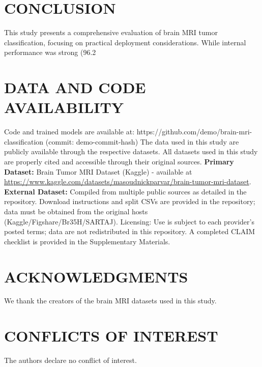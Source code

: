 \documentclass[conference]{IEEEtran}
\begin{document}
\section{CONCLUSION}

This study presents a comprehensive evaluation of brain MRI tumor classification, focusing on practical deployment considerations. While internal performance was strong (96.2%

\section{DATA AND CODE AVAILABILITY}

Code and trained models are available at: https://github.com/demo/brain-mri-classification (commit: demo-commit-hash)
The data used in this study are publicly available through the respective datasets. All datasets used in this study are properly cited and accessible through their original sources. \textbf{Primary Dataset:} Brain Tumor MRI Dataset (Kaggle) - available at \url{https://www.kaggle.com/datasets/masoudnickparvar/brain-tumor-mri-dataset}. \textbf{External Dataset:} Compiled from multiple public sources as detailed in the repository. Download instructions and split CSVs are provided in the repository; data must be obtained from the original hosts (Kaggle/Figshare/Br35H/SARTAJ). Licensing: Use is subject to each provider's posted terms; data are not redistributed in this repository. A completed CLAIM checklist is provided in the Supplementary Materials.

\section{ACKNOWLEDGMENTS}

We thank the creators of the brain MRI datasets used in this study.

\section{CONFLICTS OF INTEREST}

The authors declare no conflict of interest.
\end{document}
